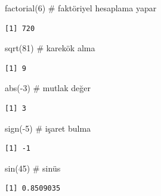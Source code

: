 \documentclass[
  letterpaper,
  DIV=11,
  numbers=noendperiod]{scrreprt}
\newenvironment{Shaded}{\begin{snugshade}}{\end{snugshade}}
\newcommand{\CommentTok}[1]{\textcolor[rgb]{0.37,0.37,0.37}{#1}}
\newcommand{\DecValTok}[1]{\textcolor[rgb]{0.68,0.00,0.00}{#1}}
\newcommand{\FunctionTok}[1]{\textcolor[rgb]{0.28,0.35,0.67}{#1}}
\newcommand{\NormalTok}[1]{\textcolor[rgb]{0.00,0.23,0.31}{#1}}
\newcommand{\SpecialCharTok}[1]{\textcolor[rgb]{0.37,0.37,0.37}{#1}}
\begin{document}
\begin{Shaded}
\begin{Highlighting}[]
\FunctionTok{factorial}\NormalTok{(}\DecValTok{6}\NormalTok{) }\CommentTok{\# faktöriyel hesaplama yapar }
\end{Highlighting}
\end{Shaded}

\begin{verbatim}
[1] 720
\end{verbatim}

\begin{Shaded}
\begin{Highlighting}[]
\FunctionTok{sqrt}\NormalTok{(}\DecValTok{81}\NormalTok{) }\CommentTok{\# karekök alma }
\end{Highlighting}
\end{Shaded}

\begin{verbatim}
[1] 9
\end{verbatim}

\begin{Shaded}
\begin{Highlighting}[]
\FunctionTok{abs}\NormalTok{(}\SpecialCharTok{{-}}\DecValTok{3}\NormalTok{) }\CommentTok{\# mutlak değer }
\end{Highlighting}
\end{Shaded}

\begin{verbatim}
[1] 3
\end{verbatim}

\begin{Shaded}
\begin{Highlighting}[]
\FunctionTok{sign}\NormalTok{(}\SpecialCharTok{{-}}\DecValTok{5}\NormalTok{) }\CommentTok{\# işaret bulma }
\end{Highlighting}
\end{Shaded}

\begin{verbatim}
[1] -1
\end{verbatim}

\begin{Shaded}
\begin{Highlighting}[]
\FunctionTok{sin}\NormalTok{(}\DecValTok{45}\NormalTok{) }\CommentTok{\# sinüs }
\end{Highlighting}
\end{Shaded}

\begin{verbatim}
[1] 0.8509035
\end{verbatim}
\end{document}
